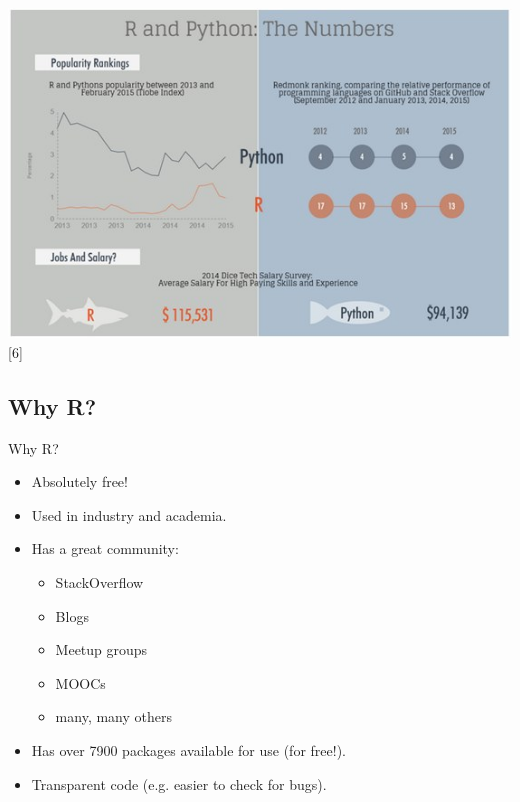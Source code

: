 \begin{frame}
	       \begin{center}
	         \includegraphics[scale=0.25]{images/r-vs-python-numbers}[6]
	        \end{center}
\end{frame}


\subsection{Why R?}
\begin{frame}
	\begin{center}
  		\begin{block}{Why R?} 
			\begin{itemize}
				\item Absolutely free!
				\item Used in industry and academia.
				\item Has a great community:
					\begin{itemize}
						\item StackOverflow
						\item Blogs
						\item Meetup groups
						\item MOOCs
						\item many, many others
					\end{itemize}
				\item Has over 7900 packages available for use (for free!).
				\item Transparent code (e.g. easier to check for bugs).
			\end{itemize}
		\end{block}
	\end{center} 
\end{frame}

